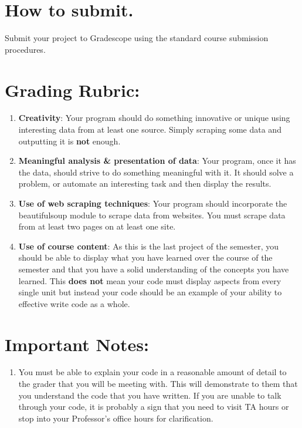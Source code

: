 \documentclass[11pt, letterpaper, onecolumn, oneside, final]{article}
\begin{document}
\section{How to submit.}
Submit your project to Gradescope using the standard course submission procedures. 
\section{Grading Rubric:} 
    \begin{enumerate}
        \item \textbf{Creativity}: Your program should do something innovative or unique using interesting data from at least one source. Simply scraping some data and outputting it is \textbf{not} enough.
        \item \textbf{Meaningful analysis \& presentation of data}: Your program, once it has the data, should strive to do something meaningful with it. It should solve a problem, or automate an interesting task and then display the results. 
        \item \textbf{Use of web scraping techniques}: Your program should incorporate the {\consolas beautifulsoup} module to scrape data from websites. You must scrape data from at least two pages on at least one site. 
        \item \textbf{Use of course content}: As this is the last project of the semester, you should be able to display what you have learned over the course of the semester and that you have a solid understanding of the concepts you have learned. This \textbf{does not} mean your code must display aspects from every single unit but instead your code should be an example of your ability to effective write code as a whole. 
    \end{enumerate}
    \section{Important Notes:} 
    \begin{enumerate}
        \item You must be able to explain your code in a reasonable amount of detail to the grader that you will be meeting with. This will demonstrate to them that you understand the code that you have written. If you are unable to talk through your code, it is probably a sign that you need to visit TA hours or stop into your Professor's office hours for clarification. 
    \end{enumerate}
\end{document}
